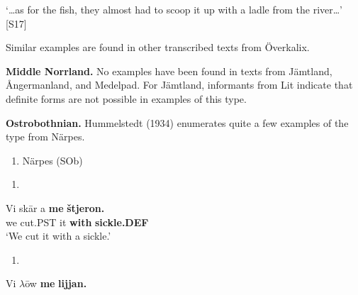 ‘…as for the fish, they almost had to scoop it up with a ladle from the river…’ [S17]
\z

Similar examples are found in other transcribed texts from Överkalix. 

\textbf{Middle Norrland.} No examples have been found in texts from Jämtland, Ångermanland, and Medelpad. For Jämtland, informants from Lit indicate that definite forms are not possible in examples of this type.

\textbf{Ostrobothnian. }Hummelstedt (1934) enumerates quite a few examples of the type from Närpes. 

\begin{enumerate} %
\item 
Närpes (SOb) 

\end{enumerate} %
\setcounter{listLFOxcviiileveli}{0}
\begin{enumerate} %
\item 
\end{enumerate} %
\ea\label{}
\gll Vi  sk\=ar  a  \textbf{me} \textbf{štjeron.} \\


we  cut.PST  it  \textbf{with} \textbf{sickle.DEF} \\ %


‘We cut it with a sickle.’
\z


\begin{enumerate} %
\item 
\end{enumerate} %
\ea\label{}
\gll Vi  $\lambda $\=ow  \textbf{me} \textbf{lijjan.} \\


